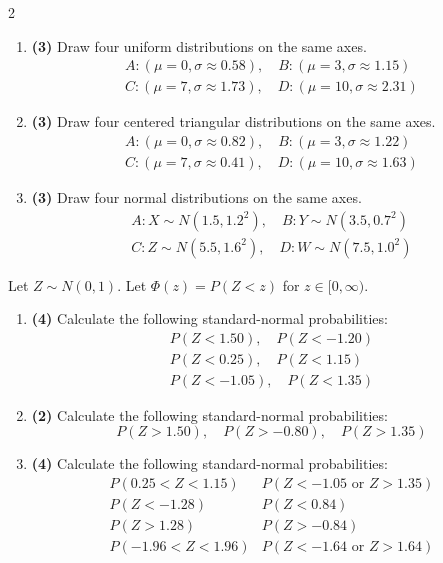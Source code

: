 \begin{multicols}{2}
		\begin{enumerate}[label=\textbf{\alph*)}]
			\item \textbf{(3)} Draw four uniform distributions on the same axes.
			\[
			\begin{aligned}
				A:(\mu=0,\sigma\approx0.58),\quad B:(\mu=3,\sigma\approx1.15)\\
				C:(\mu=7,\sigma\approx1.73),\quad D:(\mu=10,\sigma\approx2.31)
			\end{aligned}
			\]
			\item \textbf{(3)} Draw four centered triangular distributions on the same axes. 
			\[
			\begin{aligned}
				A:(\mu=0,\sigma\approx0.82),\quad B:(\mu=3,\sigma\approx1.22)\\
				C:(\mu=7,\sigma\approx0.41),\quad D:(\mu=10,\sigma\approx1.63)
			\end{aligned}
			\]
			
			\item \textbf{(3)} Draw four normal distributions on the same axes. 
			\[
			\begin{aligned}
				A:X\sim N(1.5,1.2^2),\quad B:Y\sim N(3.5,0.7^2)\\
				C:Z\sim N(5.5,1.6^2),\quad D:W\sim N(7.5,1.0^2)
			\end{aligned}
			\]
		\end{enumerate}
		
		\vspace{0.25cm}
		\vspace{-0.3cm}
		Let \(Z\sim N(0,1)\). Let \(\Phi(z)=P(Z<z)\) for \(z\in[0,\infty)\).
		
		
		\begin{enumerate}[label=\textbf{\alph*)}]
			\item \textbf{(4)} Calculate the following standard-normal probabilities:
			\[
			\begin{aligned}
				P(Z<1.50),\quad P(Z<-1.20)\\
				P(Z<0.25),\quad P(Z<1.15)\\
				P(Z<-1.05),\quad P(Z<1.35)
			\end{aligned}
			\]
			
			\item \textbf{(2)} Calculate the following standard-normal probabilities:
			\[
			P(Z>1.50),\quad
			P(Z>-0.80),\quad
			P(Z>1.35)
			\]
			
			\item \textbf{(4)} Calculate the following standard-normal probabilities:
			\[
			\begin{array}{cc}
				P(0.25<Z<1.15) & P(Z<-1.05\text{ or }Z>1.35)\\
				P(Z<-1.28) & P(Z<0.84)\\
				P(Z>1.28) & P(Z>-0.84)\\
				P(-1.96<Z<1.96) & P(Z<-1.64\text{ or }Z>1.64)
			\end{array}
			\]
		\end{enumerate}
		

\end{multicols}

